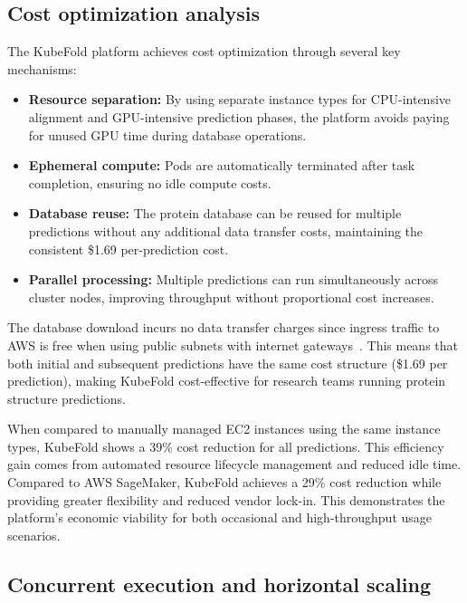 \subsection{Cost optimization analysis}

The KubeFold platform achieves cost optimization through several key mechanisms:

\begin{itemize}
    \item \textbf{Resource separation:} By using separate instance types for CPU-intensive alignment and GPU-intensive prediction phases, the platform avoids paying for unused GPU time during database operations.
    
    \item \textbf{Ephemeral compute:} Pods are automatically terminated after task completion, ensuring no idle compute costs.
    
    \item \textbf{Database reuse:} The protein database can be reused for multiple predictions without any additional data transfer costs, maintaining the consistent \$1.69 per-prediction cost.
    
    \item \textbf{Parallel processing:} Multiple predictions can run simultaneously across cluster nodes, improving throughput without proportional cost increases.
\end{itemize}

The database download incurs no data transfer charges since ingress traffic to AWS is free when using public subnets with internet gateways~\cite{aws-ec2-pricing}. This means that both initial and subsequent predictions have the same cost structure (\$1.69 per prediction), making KubeFold cost-effective for research teams running protein structure predictions.

When compared to manually managed EC2 instances using the same instance types, KubeFold shows a 39\% cost reduction for all predictions. This efficiency gain comes from automated resource lifecycle management and reduced idle time. Compared to AWS SageMaker, KubeFold achieves a 29\% cost reduction while providing greater flexibility and reduced vendor lock-in. This demonstrates the platform's economic viability for both occasional and high-throughput usage scenarios.

\subsection{Concurrent execution and horizontal scaling}

